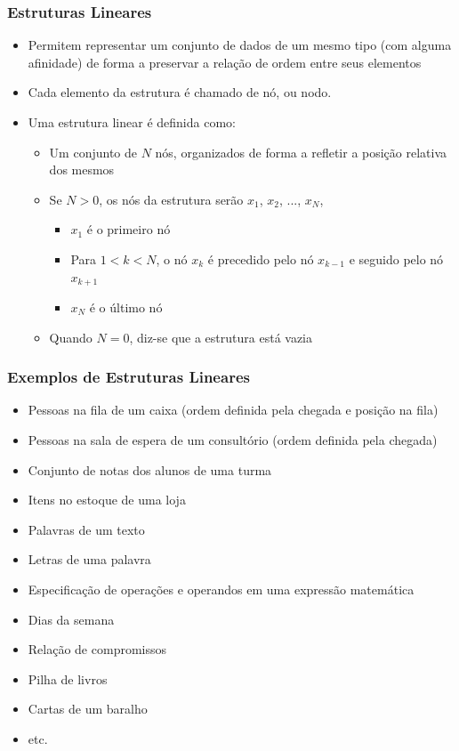 \documentclass[aspectratio=169]{beamer}
\begin{document}
\begin{frame}\frametitle{Estruturas Lineares}
\begin{itemize}
	\item Permitem representar um conjunto de dados de um mesmo tipo (com alguma afinidade) de forma a preservar a relação de ordem entre seus elementos
	\item Cada elemento da estrutura é chamado de nó, ou nodo.
	\item Uma estrutura linear é definida como:
	\begin{itemize}
		\item Um conjunto de $N$ nós, organizados de forma a refletir a posição relativa dos mesmos
		\item Se $N > 0$, os nós da estrutura serão $x_1$, $x_2$, ..., $x_N$, 
		\begin{itemize}
			\item $x_1$ é o primeiro nó
			\item Para $1 < k < N$, o nó $x_k$ é precedido pelo nó $x_{k-1}$ e seguido pelo nó $x_{k+1}$
			\item $x_N$ é o último nó
		\end{itemize}
		\item Quando $N = 0$, diz-se que a estrutura está vazia
	\end{itemize}
\end{itemize}
\end{frame}

\begin{frame}\frametitle{Exemplos de Estruturas Lineares}
\begin{itemize}
	\item Pessoas na fila de um caixa (ordem definida pela chegada e posição na fila)
	\item Pessoas na sala de espera de um consultório (ordem definida pela chegada)
	\item Conjunto de notas dos alunos de uma turma
	\item Itens no estoque de uma loja
	\item Palavras de um texto
	\item Letras de uma palavra
	\item Especificação de operações e operandos em uma expressão matemática
	\item Dias da semana
	\item Relação de compromissos
	\item Pilha de livros
	\item Cartas de um baralho
	\item etc.
\end{itemize}
\end{frame}
\end{document}
